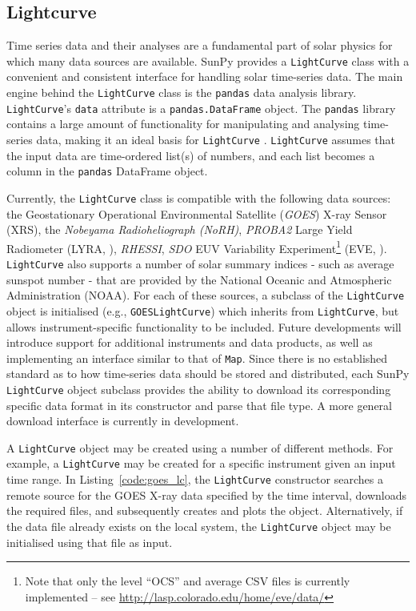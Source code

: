 \subsection{Lightcurve}\label{ssec:lightcurve}

Time series data and their analyses are a fundamental part of solar
physics for which many data sources are available.
SunPy provides a \texttt{LightCurve} class
with a convenient and consistent interface for handling solar time-series
data.  The main engine behind the \texttt{LightCurve} class is
the {\texttt{pandas}} data analysis library.  
\texttt{LightCurve}'s \texttt{data} attribute is a \texttt{pandas.DataFrame} 
object. The \texttt{pandas} library contains a large amount
of functionality for manipulating and analysing time-series data,
making it an ideal basis for \texttt{LightCurve} \citep{mckinney2012}.  \texttt{LightCurve}
assumes that the input data are time-ordered list(s) of numbers, and each
list becomes a column in the \texttt{pandas} DataFrame object.

Currently, the \texttt{LightCurve} class is compatible with the
following data sources: the Geostationary Operational Environmental
Satellite (\textit{GOES}) X-ray Sensor (XRS), the \textit{Nobeyama
  Radioheliograph (NoRH)}, \textit{PROBA2} Large Yield Radiometer
(LYRA, \citealt{2013SoPh..286...21D}), \textit{RHESSI},
\textit{SDO} EUV Variability Experiment\footnote{Note that only the level ``OCS'' and average
  CSV files is currently implemented -- see
  \url{http://lasp.colorado.edu/home/eve/data/}} (EVE, \citealt{2012SoPh..275..115W}). 
\texttt{LightCurve}
also supports a number of solar summary indices - such as average
sunspot number - that are provided by the National Oceanic and
Atmospheric Administration (NOAA).  For each of these sources, a
subclass of the \texttt{LightCurve} object is initialised (e.g.,
\texttt{GOESLightCurve}) which inherits from \texttt{LightCurve}, but
allows instrument-specific functionality to be included.  Future
developments will introduce support for additional instruments and
data products, as well as implementing an interface similar to that of
\texttt{Map}.  Since there is no established standard as to how
time-series data should be stored and distributed, each SunPy
\texttt{LightCurve} object subclass provides the ability to download
its corresponding specific data format in its constructor and parse
that file type. A more general download interface is currently in development.

A \texttt{LightCurve} object may be created using a number of different methods. 
For example, a \texttt{LightCurve} may be created for a specific instrument given
an input time range. In Listing~\ref{code:goes_lc}, 
the \texttt{LightCurve} constructor searches a remote source for the GOES X-ray 
data specified by the time interval, downloads the required files, and 
subsequently creates and plots the object. Alternatively, if the data file 
already exists on the local system, the \texttt{LightCurve} object may be 
initialised using that file as input.


